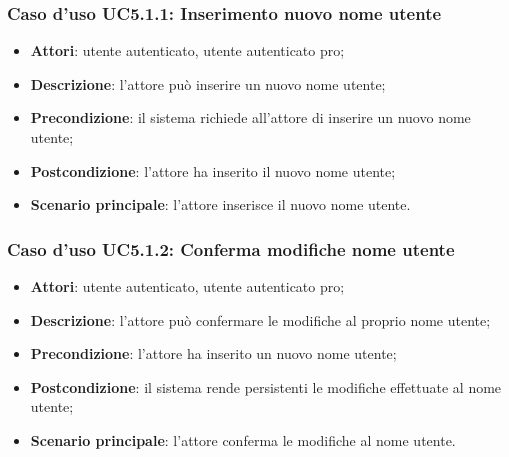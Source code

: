 \subsubsection{Caso d'uso UC5.1.1: Inserimento nuovo nome utente}

\begin{itemize}
	\item \textbf{Attori}: utente autenticato, utente autenticato pro;
	\item \textbf{Descrizione}: l'attore può inserire un nuovo nome utente;
	\item \textbf{Precondizione}: il sistema richiede all'attore di inserire un nuovo nome utente;
	\item \textbf{Postcondizione}: l'attore ha inserito il nuovo nome utente;
	\item \textbf{Scenario principale}: l'attore inserisce il nuovo nome utente.
\end{itemize}

\subsubsection{Caso d'uso UC5.1.2: Conferma modifiche nome utente}

\begin{itemize}
	\item \textbf{Attori}: utente autenticato, utente autenticato pro;
	\item \textbf{Descrizione}: l'attore può confermare le modifiche al proprio nome utente;
	\item \textbf{Precondizione}: l'attore ha inserito un nuovo nome utente;
	\item \textbf{Postcondizione}: il sistema rende persistenti le modifiche effettuate al nome utente;
	\item \textbf{Scenario principale}: l'attore conferma le modifiche al nome utente.
\end{itemize}

